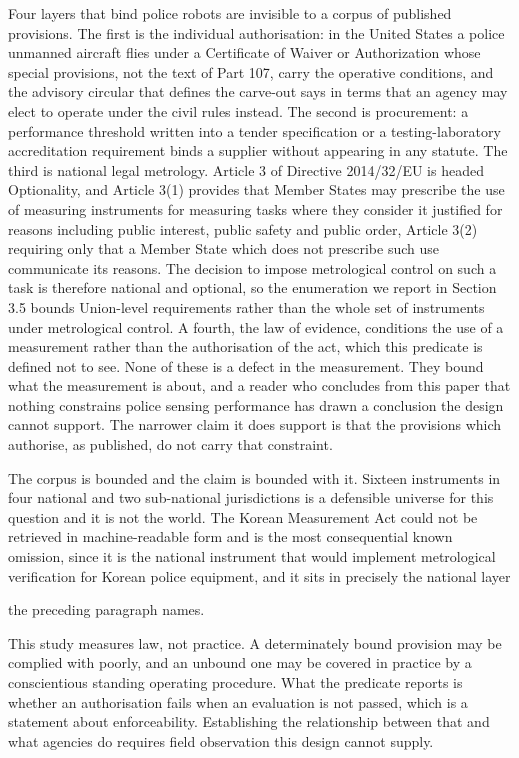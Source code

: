 Four layers that bind police robots are invisible to a corpus of published provisions. The first is the individual authorisation: in the United States a police unmanned aircraft flies under a Certificate of Waiver or Authorization whose special provisions, not the text of Part 107, carry the operative conditions, and the advisory circular that defines the carve-out says in terms that an agency may elect to operate under the civil rules instead. The second is procurement: a performance threshold written into a tender specification or a testing-laboratory accreditation requirement binds a supplier without appearing in any statute. The third is national legal metrology. Article 3 of Directive 2014/32/EU is headed Optionality, and Article 3(1) provides that Member States may prescribe the use of measuring instruments for measuring tasks where they consider it justified for reasons including public interest, public safety and public order, Article 3(2) requiring only that a Member State which does not prescribe such use communicate its reasons. The decision to impose metrological control on such a task is therefore national and optional, so the enumeration we report in Section 3.5 bounds Union-level requirements rather than the whole set of instruments under metrological control. A fourth, the law of evidence, conditions the use of a measurement rather than the authorisation of the act, which this predicate is defined not to see. None of these is a defect in the measurement. They bound what the measurement is about, and a reader who concludes from this paper that nothing constrains police sensing performance has drawn a conclusion the design cannot support. The narrower claim it does support is that the provisions which authorise, as published, do not carry that constraint.

The corpus is bounded and the claim is bounded with it. Sixteen instruments in four national and two sub-national jurisdictions is a defensible universe for this question and it is not the world. The Korean Measurement Act could not be retrieved in machine-readable form and is the most consequential known omission, since it is the national instrument that would implement metrological verification for Korean police equipment, and it sits in precisely the national layer

the preceding paragraph names.

This study measures law, not practice. A determinately bound provision may be complied with poorly, and an unbound one may be covered in practice by a conscientious standing operating procedure. What the predicate reports is whether an authorisation fails when an evaluation is not passed, which is a statement about enforceability. Establishing the relationship between that and what agencies do requires field observation this design cannot supply.

